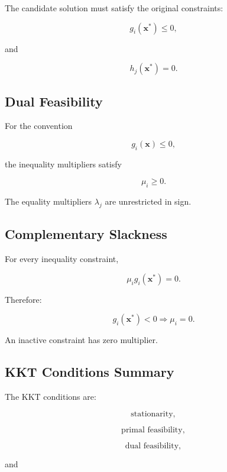 The candidate solution must satisfy the original constraints:

\[
\boxed{
g_i(\mathbf{x}^*)\leq0,
}
\]

and

\[
\boxed{
h_j(\mathbf{x}^*)=0.
}
\]

\subsection{Dual Feasibility}
\label{subsec:kkt-dual-feasibility}

For the convention

\[
g_i(\mathbf{x})\leq0,
\]

the inequality multipliers satisfy

\[
\boxed{
\mu_i\geq0.
}
\]

The equality multipliers \(\lambda_j\) are unrestricted in sign.

\subsection{Complementary Slackness}
\label{subsec:complementary-slackness}

For every inequality constraint,

\[
\boxed{
\mu_i
g_i(\mathbf{x}^*)
=
0.
}
\]

Therefore:

\[
g_i(\mathbf{x}^*)<0
\Rightarrow
\mu_i=0.
\]

An inactive constraint has zero multiplier.

\subsection{KKT Conditions Summary}
\label{subsec:kkt-summary}

The KKT conditions are:

\[
\boxed{
\text{stationarity},
}
\]

\[
\boxed{
\text{primal feasibility},
}
\]

\[
\boxed{
\text{dual feasibility},
}
\]

and

